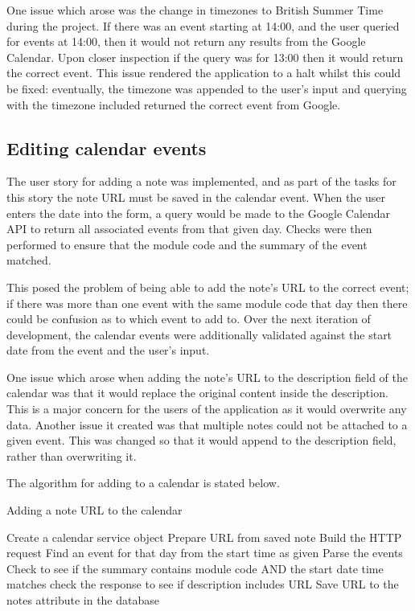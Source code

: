 {{{{{{{One issue which arose was the change in timezones to British Summer Time during the project. If there was an event starting at 14:00, and the user queried for events at 14:00, then it would not return any results from the Google Calendar. Upon closer inspection if the query was for 13:00 then it would return the correct event. This issue rendered the application to a halt whilst this could be fixed: eventually, the timezone was appended to the user's input and querying with the timezone included returned the correct event from Google.

\subsection{Editing calendar events}
The user story for adding a note was implemented, and as part of the tasks for this story the note URL must be saved in the calendar event. When the user enters the date into the form, a query would be made to the Google Calendar API to return all associated events from that given day. Checks were then performed to ensure that the module code and the summary of the event matched.

This posed the problem of being able to add the note's URL to the correct event; if there was more than one event with the same module code that day then there could be confusion as to which event to add to.
Over the next iteration of development, the calendar events were additionally validated against the start date from the event and the user's input.

One issue which arose when adding the note's URL to the description field of the calendar was that it would replace the original content inside the description. This is a major concern for the users of the application as it would overwrite any data. Another issue it created was that multiple notes could not be attached to a given event. This was changed so that it would append to the description field, rather than overwriting it.

The algorithm for adding to a calendar is stated below.
\begin{algorithm}
  \caption{Adding a note URL to the calendar}
  \label{algorithm:threshold1}
  \begin{algorithmic}[1]
      \State Create a calendar service object
      \State Prepare URL from saved note
      \State Build the HTTP request
      \State Find an event for that day from the start time as given
      \State Parse the events
      \State Check to see if the summary contains module code AND the start date time matches
        \State check the response to see if description includes URL
        \State Save URL to the notes attribute in the database
      \EndIf
  \end{algorithmic}
\end{algorithm}

}}}}}}}
